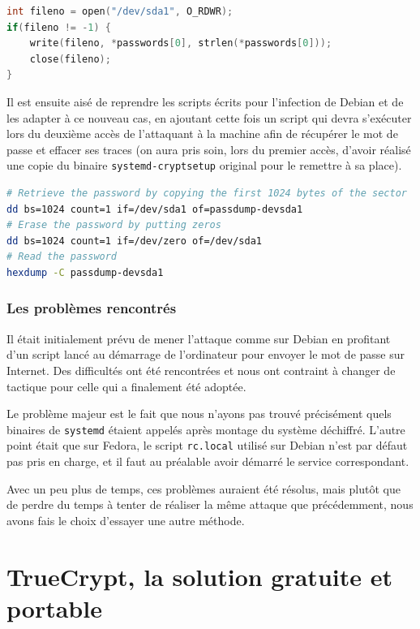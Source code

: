 \documentclass[12pt,a4paper]{article}
\begin{document}
\begin{lstlisting}[language=C]
int fileno = open("/dev/sda1", O_RDWR);
if(fileno != -1) {
	write(fileno, *passwords[0], strlen(*passwords[0]));
	close(fileno);
}
\end{lstlisting}

Il est ensuite aisé de reprendre les scripts écrits pour l'infection de Debian et de les adapter à ce nouveau cas, en ajoutant cette fois un script qui devra s'exécuter lors du deuxième accès de l'attaquant à la machine afin de récupérer le mot de passe et effacer ses traces (on aura pris soin, lors du premier accès, d'avoir réalisé une copie du binaire \texttt{systemd-cryptsetup} original pour le remettre à sa place).

\begin{lstlisting}[language=Bash]
# Retrieve the password by copying the first 1024 bytes of the sector
dd bs=1024 count=1 if=/dev/sda1 of=passdump-devsda1
# Erase the password by putting zeros
dd bs=1024 count=1 if=/dev/zero of=/dev/sda1
# Read the password
hexdump -C passdump-devsda1
\end{lstlisting}


\subsubsection*{Les problèmes rencontrés}

Il était initialement prévu de mener l'attaque comme sur Debian en profitant d'un script lancé au démarrage de l'ordinateur pour envoyer le mot de passe sur Internet. Des difficultés ont été rencontrées et nous ont contraint à changer de tactique pour celle qui a finalement été adoptée.

Le problème majeur est le fait que nous n'ayons pas trouvé précisément quels binaires de \texttt{systemd} étaient appelés après montage du système déchiffré. L'autre point était que sur Fedora, le script \texttt{rc.local} utilisé sur Debian n'est par défaut pas pris en charge, et il faut au préalable avoir démarré le service correspondant.

Avec un peu plus de temps, ces problèmes auraient été résolus, mais plutôt que de perdre du temps à tenter de réaliser la même attaque que précédemment, nous avons fais le choix d'essayer une autre méthode.


\section{TrueCrypt, la solution gratuite et portable}
\end{document}
